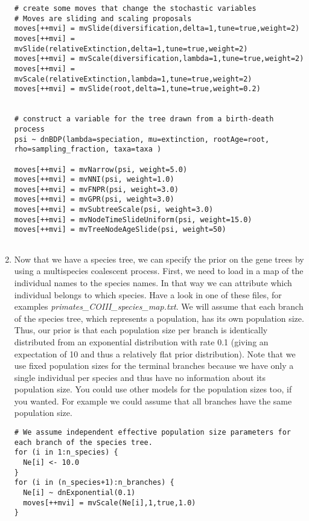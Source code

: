 \begin{enumerate}
{\begin{snugshade*}
\begin{lstlisting}
# create some moves that change the stochastic variables
# Moves are sliding and scaling proposals
moves[++mvi] = mvSlide(diversification,delta=1,tune=true,weight=2)
moves[++mvi] = mvSlide(relativeExtinction,delta=1,tune=true,weight=2)
moves[++mvi] = mvScale(diversification,lambda=1,tune=true,weight=2)
moves[++mvi] = mvScale(relativeExtinction,lambda=1,tune=true,weight=2)
moves[++mvi] = mvSlide(root,delta=1,tune=true,weight=0.2)


# construct a variable for the tree drawn from a birth-death process
psi ~ dnBDP(lambda=speciation, mu=extinction, rootAge=root, rho=sampling_fraction, taxa=taxa )

moves[++mvi] = mvNarrow(psi, weight=5.0)
moves[++mvi] = mvNNI(psi, weight=1.0)
moves[++mvi] = mvFNPR(psi, weight=3.0)
moves[++mvi] = mvGPR(psi, weight=3.0)
moves[++mvi] = mvSubtreeScale(psi, weight=3.0)
moves[++mvi] = mvNodeTimeSlideUniform(psi, weight=15.0)
moves[++mvi] = mvTreeNodeAgeSlide(psi, weight=50)


\end{lstlisting}
\end{snugshade*}}
\item Now that we have a species tree, we can specify the prior on the gene trees by using a multispecies coalescent process.
First, we need to load in a map of the individual names to the species names.
In that way we can attribute which individual belongs to which species.
Have a look in one of these files, for examples \textit{primates\_COIII\_species\_map.txt}.
We will assume that each branch of the species tree, which represents a population, has its own population size.
Thus, our prior is that each population size per branch is identically distributed from an exponential distribution with rate 0.1 (giving an expectation of 10 and thus a relatively flat prior distribution).
Note that we use fixed population sizes for the terminal branches because we have only a single individual per species and thus have no information about its population size.
You could use other models for the population sizes too, if you wanted.
For example we could assume that all branches have the same population size.
{\tt \begin{snugshade*}
\begin{lstlisting}
# We assume independent effective population size parameters for each branch of the species tree.
for (i in 1:n_species) {
  Ne[i] <- 10.0
}
for (i in (n_species+1):n_branches) {
  Ne[i] ~ dnExponential(0.1)
  moves[++mvi] = mvScale(Ne[i],1,true,1.0)
}


\end{lstlisting}
\end{snugshade*}}
\end{enumerate}
